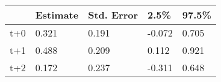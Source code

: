 \begin{tabular}{lllll}
  \toprule
  & Estimate & Std. Error & 2.5\% & 97.5\% \\ 
  \midrule
t+0 & 0.321 & 0.191 & -0.072 & 0.705 \\ 
  t+1 & 0.488 & 0.209 & 0.112 & 0.921 \\ 
  t+2 & 0.172 & 0.237 & -0.311 & 0.648 \\ 
   \bottomrule
\end{tabular}
